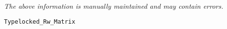 \label{pkg:rw\_matrix\_of\_one\_byte\_unts}

{\tiny \it The above information is manually maintained and may contain errors.}
\begin{verbatim}
Typelocked_Rw_Matrix
\end{verbatim}
